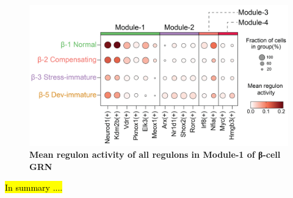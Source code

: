 \begin{figure}[t]
\centering
\includegraphics[width=12cm]{Chapter5/Fig/F3-12-v2-01.png}
\caption[Mean regulon activity of all regulons in Module-1 of β-cell GRN]{\textbf{Mean regulon activity of all regulons in Module-1 of β-cell GRN}\\}
\label{fig:3-12-1}
\end{figure}





\hl{In summary ....}

